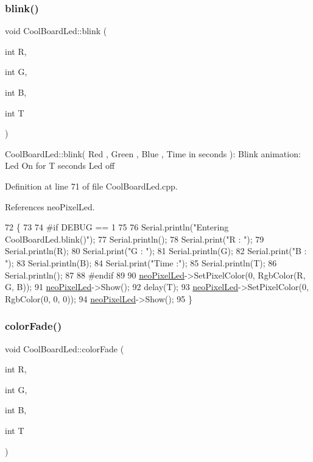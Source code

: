 \subsubsection{\texorpdfstring{blink()}{blink()}}
{\footnotesize\ttfamily void Cool\+Board\+Led\+::blink (\begin{DoxyParamCaption}\item[{int}]{R,  }\item[{int}]{G,  }\item[{int}]{B,  }\item[{int}]{T }\end{DoxyParamCaption})}

Cool\+Board\+Led\+::blink( Red , Green , Blue , Time in seconds )\+: Blink animation\+: Led On for T seconds Led off 

Definition at line 71 of file Cool\+Board\+Led.\+cpp.



References neo\+Pixel\+Led.


\begin{DoxyCode}
72 \{
73 
74 \textcolor{preprocessor}{#if DEBUG == 1}
75 
76     Serial.println(\textcolor{stringliteral}{"Entering CoolBoardLed.blink()"});
77     Serial.println();
78     Serial.print(\textcolor{stringliteral}{"R : "});
79     Serial.println(R);
80     Serial.print(\textcolor{stringliteral}{"G : "});
81     Serial.println(G);
82     Serial.print(\textcolor{stringliteral}{"B : "});
83     Serial.println(B);
84     Serial.print(\textcolor{stringliteral}{"Time :"});
85     Serial.println(T);
86     Serial.println();
87 
88 \textcolor{preprocessor}{#endif  }
89 
90     \hyperlink{classCoolBoardLed_ac2c13fa462a010cd9242bf297c013923}{neoPixelLed}->SetPixelColor(0, RgbColor(R, G, B));
91     \hyperlink{classCoolBoardLed_ac2c13fa462a010cd9242bf297c013923}{neoPixelLed}->Show();
92     delay(T);
93     \hyperlink{classCoolBoardLed_ac2c13fa462a010cd9242bf297c013923}{neoPixelLed}->SetPixelColor(0, RgbColor(0, 0, 0));
94     \hyperlink{classCoolBoardLed_ac2c13fa462a010cd9242bf297c013923}{neoPixelLed}->Show();
95 \}
\end{DoxyCode}
\mbox{\label{classCoolBoardLed_a6dbfe23988f43e1242cd05e69b13ff30}} 
\subsubsection{\texorpdfstring{color\+Fade()}{colorFade()}}
{\footnotesize\ttfamily void Cool\+Board\+Led\+::color\+Fade (\begin{DoxyParamCaption}\item[{int}]{R,  }\item[{int}]{G,  }\item[{int}]{B,  }\item[{int}]{T }\end{DoxyParamCaption})}

